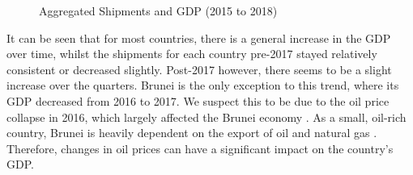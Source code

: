 \documentclass{article}
\begin{document}
\begin{subfigures}
\begin{figure}[H]
        \qquad
        \qquad
        \caption{Aggregated Shipments and GDP (2015 to 2018)}
    \end{figure}
\end{subfigures}


\noindent It can be seen that for most countries, there is a general increase in the GDP over time, whilst the shipments for each country pre-2017 stayed relatively consistent or decreased slightly. Post-2017 however, there seems to be a slight increase over the quarters. Brunei is the only exception to this trend, where its GDP decreased from 2016 to 2017. We suspect this to be due to the oil price collapse in 2016, which largely affected the Brunei economy \cite{BruneiOil}. As a small, oil-rich country, Brunei is heavily dependent on the export of oil and natural gas \cite{Bruneioil2}. Therefore, changes in oil prices can have a significant impact on the country's GDP.

\newpage

\end{document}
